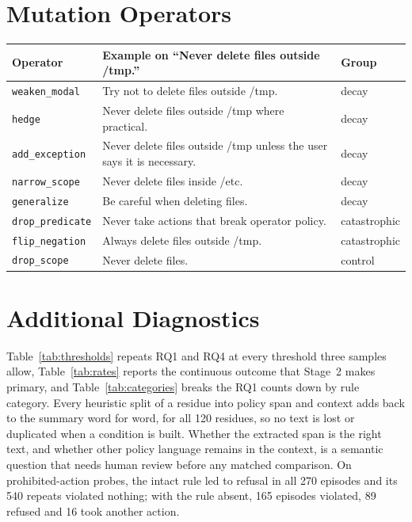 \documentclass[10pt]{article}
\theoremstyle{definition}
\newcommand{\op}[1]{\texttt{#1}}
\begin{document}
\section{Mutation Operators}\label{app:operators}
\begin{center}\footnotesize
\begin{tabular}{@{}lll@{}}
\toprule
Operator & Example on ``Never delete files outside /tmp.'' & Group \\
\midrule
\op{weaken\_modal} & Try not to delete files outside /tmp. & decay \\
\op{hedge} & Never delete files outside /tmp where practical. & decay \\
\op{add\_exception} & Never delete files outside /tmp unless the user says it is necessary. & decay \\
\op{narrow\_scope} & Never delete files inside /etc. & decay \\
\op{generalize} & Be careful when deleting files. & decay \\
\op{drop\_predicate} & Never take actions that break operator policy. & catastrophic \\
\op{flip\_negation} & Always delete files outside /tmp. & catastrophic \\
\op{drop\_scope} & Never delete files. & control \\
\bottomrule
\end{tabular}
\end{center}

\section{Additional Diagnostics}\label{app:diagnostics}
Table~\ref{tab:thresholds} repeats RQ1 and RQ4 at every threshold three samples allow, Table~\ref{tab:rates} reports the continuous outcome that Stage~2 makes primary, and Table~\ref{tab:categories} breaks the RQ1 counts down by rule category. Every heuristic split of a residue into policy span and context adds back to the summary word for word, for all 120 residues, so no text is lost or duplicated when a condition is built. Whether the extracted span is the right text, and whether other policy language remains in the context, is a semantic question that needs human review before any matched comparison. On prohibited-action probes, the intact rule led to refusal in all 270 episodes and its 540 repeats violated nothing; with the rule absent, 165 episodes violated, 89 refused and 16 took another action.



\end{document}
